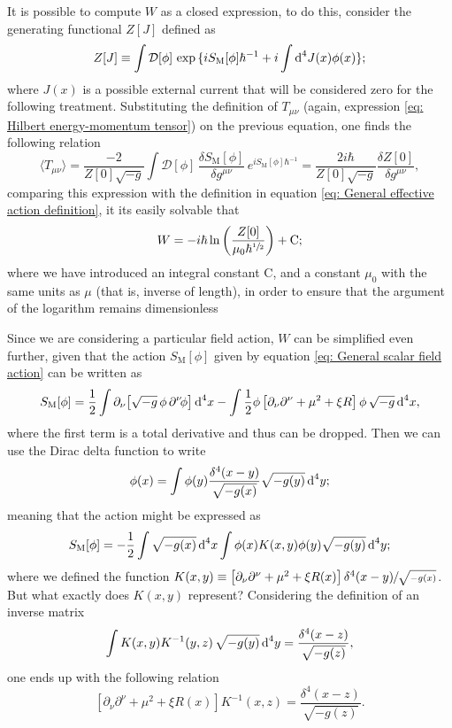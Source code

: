 It is possible to compute $W$ as a closed expression, to do this, consider the generating functional $Z[J]$ defined as
\begin{equation}
	Z[J]\equiv \int \mathcal{D}[\phi]\,\exp{\{iS_\text{M}[\phi]\hbar^{-1}+i\int\text{d}^4J(x)\phi(x)\}};
\end{equation}
where $J(x)$ is a possible external current that will be considered zero for the following treatment. Substituting the definition of $T_{\mu\nu}$ (again, expression \ref{eq: Hilbert energy-momentum tensor}) on the previous equation, one finds the following relation
\begin{equation}
	\langle T_{\mu\nu}\rangle=\frac{-2}{Z[0]\sqrt{-g}}\int \mathcal{D}[\phi]\,\frac{\delta S_\text{M}[\phi]}{\delta g^{\mu\nu}}\,e^{iS_\text{M}[\phi]\hbar^{-1}}=\frac{2i\hbar}{Z[0]\sqrt{-g}}\frac{\delta Z[0]}{\delta g^{\mu\nu}},
\end{equation}
comparing this expression with the definition in equation \ref{eq: General effective action definition}, it its easily solvable that
\begin{equation}\label{eq: Effective Action Z[0]}
	W=-i\hbar \ln\left( \frac{Z[0]}{\mu_0\hbar^{\sfrac{1}{2}}}\right)+\text{C};
\end{equation}
where we have introduced an integral constant C, and a constant $\mu_0$ with the same units as $\mu$ (that is, inverse of length), in order to ensure that the argument of the logarithm remains dimensionless

Since we are considering a particular field action, $W$ can be simplified even further, given that the action $S_\text{M}[\phi]$ given by equation \ref{eq: General scalar field action} can be written as
\begin{equation}
	S_\text{M}[\phi]=\frac{1}{2}\int\partial_\nu\!\left[\sqrt{-g}\,\phi\,\partial^\nu\!\phi\right]\text{d}^4x-\int\frac{1}{2}\phi\left[\partial_\nu\partial^\nu+\mu^2+\xi R\right]\phi\,\sqrt{-g}\,\text{d}^4x,
\end{equation}
where the first term is a total derivative and thus can be dropped. Then we can use the Dirac delta function to write
\begin{equation}
	\phi(x)=\int\phi(y)\frac{\delta^4(x-y)}{\sqrt{-g(x)}}\sqrt{-g(y)}\,\text{d}^4 y;
\end{equation}
meaning that the action might be expressed as
\begin{equation}
	S_\text{M}[\phi]=-\frac{1}{2}\int\sqrt{-g(x)}\,\text{d}^4x\int\phi(x)K(x,y)\phi(y)\sqrt{-g(y)}\,\text{d}^4 y;
\end{equation}
where we defined the function
$K(x,y)\equiv \left[\partial_\nu\partial^\nu+\mu^2+\xi R(x)\right]\delta^4(x-y)\sfrac{}{\sqrt{-g(x)}}$. But what exactly does $K(x,y)$ represent? Considering the definition of an inverse matrix
\begin{equation}
	\int K(x,y)K^{-1}(y,z)\,\sqrt{-g(y)}\,\text{d}^4y=\frac{\delta^4(x-z)}{\sqrt{-g(z)}},
\end{equation}
one ends up with the following relation
\begin{equation}
	\left[\partial_\nu\partial^\nu+\mu^2+\xi R(x)\right]K^{-1}(x,z)=\frac{\delta^4(x-z)}{\sqrt{-g(z)}}.
\end{equation}


